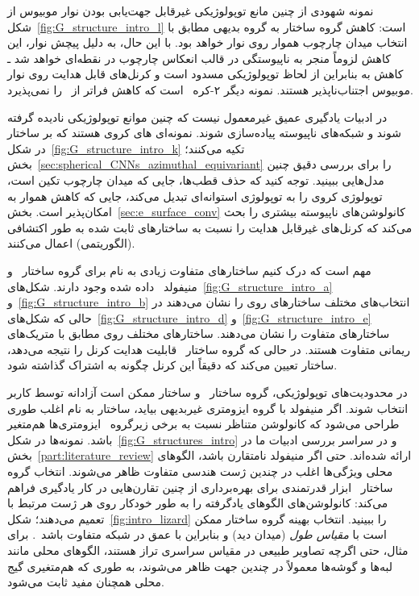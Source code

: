 نمونه شهودی از چنین مانع توپولوژیکی غیرقابل جهت‌یابی بودن نوار موبیوس از شکل~\ref{fig:G_structure_intro_l} است:
کاهش گروه ساختار به گروه بدیهی  مطابق با انتخاب میدان چارچوب هموار روی نوار خواهد بود.
با این حال، به دلیل پیچش نوار، این کاهش لزوماً منجر به ناپیوستگی در قالب انعکاس چارچوب در نقطه‌ای خواهد شد
ـ کاهش به  بنابراین از لحاظ توپولوژیکی مسدود است و کرنل‌های قابل هدایت  روی نوار موبیوس اجتناب‌ناپذیر هستند.
نمونه دیگر ۲-کره~ است که کاهش فراتر از~ را نمی‌پذیرد.


در ادبیات یادگیری عمیق غیرمعمول نیست
که چنین موانع توپولوژیکی نادیده گرفته شوند و شبکه‌های ناپیوسته پیاده‌سازی شوند.
نمونه‌ای های کروی هستند که بر ساختار  در شکل~\ref{fig:G_structure_intro_k} تکیه می‌کنند؛ بخش~\ref{sec:spherical_CNNs_azimuthal_equivariant} را برای بررسی دقیق چنین مدل‌هایی ببینید.
توجه کنید که حذف قطب‌ها، جایی که میدان چارچوب تکین است، توپولوژی کروی را به توپولوژی استوانه‌ای تبدیل می‌کند، جایی که کاهش هموار به  امکان‌پذیر است.
بخش~\ref{sec:e_surface_conv} کانولوشن‌های \lr{$\GM$} ناپیوسته بیشتری را بحث می‌کند که کرنل‌های غیرقابل هدایت را نسبت به ساختارهای  ثابت شده به طور اکتشافی (الگوریتمی) اعمال می‌کنند.


مهم است که درک کنیم ساختارهای  متفاوت زیادی به نام \lr{$\GM$}
برای گروه ساختار~ و منیفولد~ داده شده وجود دارند.
شکل‌های~\ref{fig:G_structure_intro_a} و~\ref{fig:G_structure_intro_b} انتخاب‌های مختلف ساختارهای  روی  را نشان می‌دهند در حالی که
شکل‌های~\ref{fig:G_structure_intro_d} و~\ref{fig:G_structure_intro_e} ساختارهای  متفاوت را نشان می‌دهند.
ساختارهای  مختلف روی  مطابق با متریک‌های ریمانی متفاوت هستند.
در حالی که گروه ساختار~ قابلیت هدایت  کرنل را نتیجه می‌دهد، ساختار  تعیین می‌کند که دقیقاً این کرنل چگونه به اشتراک گذاشته شود.


در محدودیت‌های توپولوژیکی،
گروه ساختار~ و ساختار  ممکن است آزادانه توسط کاربر انتخاب شوند.
اگر منیفولد با گروه ایزومتری غیربدیهی  بیاید، ساختار  به نام \lr{$\GM$} اغلب طوری طراحی می‌شود که کانولوشن \lr{$\GM$} متناظر نسبت به برخی زیرگروه~ ایزومتری‌ها هم‌متغیر باشد.
نمونه‌ها در شکل~\ref{fig:G_structures_intro} و در سراسر بررسی ادبیات ما در بخش~\ref{part:literature_review} ارائه شده‌اند.
حتی اگر منیفولد نامتقارن باشد، الگوهای محلی ویژگی‌ها اغلب در چندین ژست هندسی متفاوت ظاهر می‌شوند.
انتخاب گروه ساختار~ ابزار قدرتمندی برای بهره‌برداری از چنین تقارن‌هایی در کار یادگیری فراهم می‌کند:
کانولوشن‌های \lr{$\GM$} الگوهای یادگرفته را به طور خودکار روی هر ژست مرتبط با  تعمیم می‌دهند؛ شکل~\ref{fig:intro_lizard} را ببینید.
انتخاب بهینه گروه ساختار ممکن است با \emph{مقیاس طول} (میدان دید) و بنابراین با عمق در شبکه متفاوت باشد~\cite{Weiler2019_E2CNN}.
برای مثال، حتی اگرچه تصاویر طبیعی در مقیاس سراسری تراز هستند، الگوهای محلی مانند لبه‌ها و گوشه‌ها معمولاً در چندین جهت ظاهر می‌شوند، به طوری که هم‌متغیری گیج محلی همچنان مفید ثابت می‌شود.